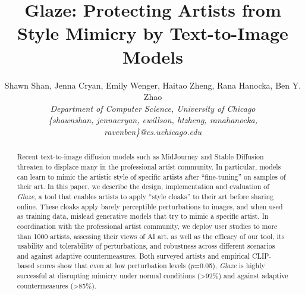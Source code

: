 \documentclass[letterpaper,twocolumn,10pt]{article}
\newcommand{\system}{{\em Glaze}}
\begin{document}
\title{Glaze: Protecting Artists from Style Mimicry by Text-to-Image Models}

\author{Shawn Shan, Jenna Cryan, Emily Wenger, Haitao Zheng, Rana Hanocka, Ben Y. Zhao\\
	{\em Department of Computer Science, University of Chicago}\\
	{\em \{shawnshan, jennacryan, ewillson, htzheng, ranahanocka, ravenben\}@cs.uchicago.edu}}
\maketitle


\begin{abstract}
  Recent text-to-image diffusion models such as MidJourney and Stable
  Diffusion threaten to displace many in the professional artist
  community. In particular, models can learn to mimic the artistic style of
  specific artists after ``fine-tuning'' on samples of their art. In this
  paper, we describe the design, implementation and evaluation of \system{},
  a tool that enables artists to apply ``style cloaks'' to their art before
  sharing online. These cloaks apply barely perceptible perturbations to
  images, and when used as training data, mislead generative models that try
  to mimic a specific artist. In coordination with the professional artist
  community, we deploy user studies to more than 1000 artists, assessing
  their views of AI art, as well as the efficacy of our tool, its usability
  and tolerability of perturbations, and robustness across different
  scenarios and against adaptive countermeasures. Both surveyed artists and
  empirical CLIP-based scores show that even at low perturbation levels ($p$=0.05),
  \system{} is highly successful at disrupting mimicry under normal
  conditions (>92\%) and against adaptive countermeasures (>85\%).

\end{abstract}



%






{
 \footnotesize
 
 
}

\balance

\appendix

\end{document}
